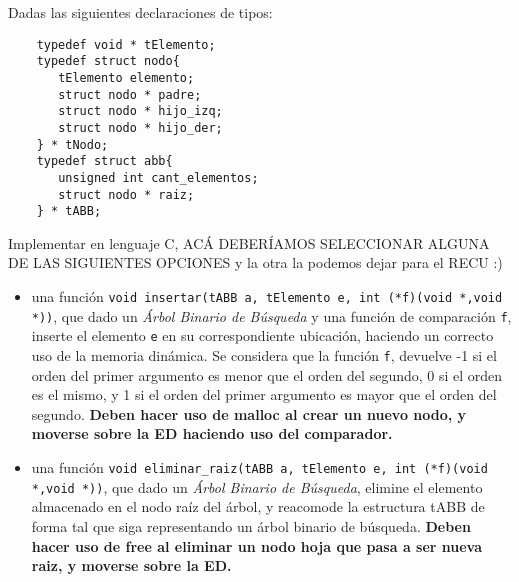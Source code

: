 \documentclass[12pt,a4paper]{article}
\begin{document}
 Dadas las siguientes declaraciones de tipos:
\begin{verbatim}
	typedef void * tElemento;
	typedef struct nodo{
	   tElemento elemento;
	   struct nodo * padre;
	   struct nodo * hijo_izq;
	   struct nodo * hijo_der;
	} * tNodo;
	typedef struct abb{
	   unsigned int cant_elementos;
	   struct nodo * raiz;
	} * tABB;
\end{verbatim}
Implementar en lenguaje C, ACÁ DEBERÍAMOS SELECCIONAR ALGUNA DE LAS SIGUIENTES OPCIONES y la otra la podemos dejar para el RECU :) 
\begin{itemize}
	\item una función \texttt{void insertar(tABB a, tElemento e, int (*f)(void *,void *))}, que dado un \emph{Árbol Binario de Búsqueda} y una función de comparación \texttt{f}, inserte el elemento \texttt{e} en su correspondiente ubicación, haciendo un correcto uso de la memoria dinámica. Se considera que la función \texttt{f}, devuelve -1 si el orden del primer argumento es menor que el orden del segundo, 0 si el orden es el mismo, y 1 si el orden del primer argumento es mayor que el orden del segundo. \textbf{Deben hacer uso de malloc al crear un nuevo nodo, y moverse sobre la ED haciendo uso del comparador.}
\end{itemize}

\begin{itemize}
	\item una función \texttt{void eliminar\_raiz(tABB a, tElemento e, int (*f)(void *,void *))}, que dado un \emph{Árbol Binario de Búsqueda}, elimine el elemento almacenado en el nodo raíz del árbol, y reacomode la estructura tABB de forma tal que siga representando un árbol binario de búsqueda. \textbf{Deben hacer uso de free al eliminar un nodo hoja que pasa a ser nueva raiz, y moverse sobre la ED.}
\end{itemize}  
\end{document}
